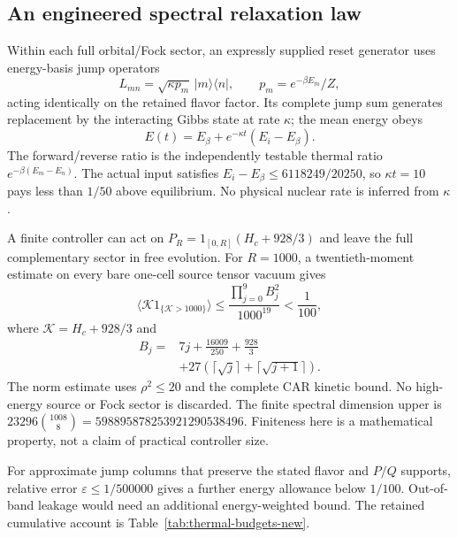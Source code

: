 \subsection{An engineered spectral relaxation law}

Within each full orbital/Fock sector, an expressly supplied reset generator
uses energy-basis jump operators
\begin{equation}
L_{mn}=\sqrt{\kappa p_m}\,|m\rangle\langle n|,
\qquad p_m=e^{-\beta E_m}/Z,
\end{equation}
acting identically on the retained flavor factor. Its complete jump sum
generates replacement by the interacting Gibbs state at rate $\kappa$;
the mean energy obeys
\begin{equation}
E(t)=E_\beta+e^{-\kappa t}(E_i-E_\beta).
\end{equation}
The forward/reverse ratio is the independently testable thermal ratio
$e^{-\beta(E_m-E_n)}$. The actual input satisfies
$E_i-E_\beta\leq6118249/20250$, so $\kappa t=10$ pays less than $1/50$
above equilibrium. No physical nuclear rate is inferred from $\kappa$.

A finite controller can act on
$P_R=1_{[0,R]}(H_c+928/3)$ and leave the full complementary sector in free
evolution. For $R=1000$, a twentieth-moment estimate on every bare one-cell
source tensor vacuum gives
\begin{equation}
\langle\mathcal K1_{\{\mathcal K>1000\}}\rangle
\leq\frac{\prod_{j=0}^{9}B_j^2}{1000^{19}}<\frac1{100},
\end{equation}
where $\mathcal K=H_c+928/3$ and
\begin{equation}
\begin{split}
B_j={}&7j+\frac{16009}{250}+\frac{928}{3}\\
&+27(\lceil\sqrt j\rceil+\lceil\sqrt{j+1}\rceil).
\end{split}
\end{equation}
The norm estimate uses $\rho^2\leq20$ and the complete CAR kinetic bound.
No high-energy source or Fock sector is discarded. The finite spectral
dimension upper is
$23296\binom{1008}{8}=598895878253921290538496$.
Finiteness here is a mathematical property, not a claim of practical
controller size.

For approximate jump columns that preserve the stated flavor and $P/Q$
supports, relative error $\varepsilon\leq1/500000$ gives a further energy
allowance below $1/100$. Out-of-band leakage would need an additional
energy-weighted bound. The retained cumulative account is
Table~\ref{tab:thermal-budgets-new}.

